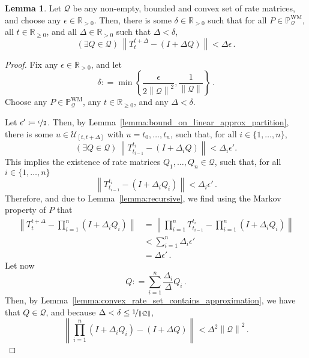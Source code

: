 \documentclass[10pt]{paper}
\theoremstyle{definition}
\newtheorem{lemma}[theorem]{Lemma}
\newcommand{\reals}{\mathbb{R}}
\newcommand{\realspos}{\reals_{>0}}
\newcommand{\realsnonneg}{\reals_{\geq 0}}
\newcommand{\processes}{\mathbb{P}}
\newcommand{\wmprocesses}{\processes^{\mathrm{WM}}}
\newcommand{\rateset}{\mathcal{Q}}
\newcommand{\norm}[1]{\left\lVert #1 \right\rVert}
\newcommand{\coloneqq}{:\!=}
\begin{document}
\begin{lemma}\label{lemma:uniform_delta_for_convex_markov_set}
Let $\rateset$ be any non-empty, bounded and convex set of rate matrices, and choose any $\epsilon\in\realspos$. Then, there is some $\delta\in\realspos$ such that for all $P\in\wmprocesses_\rateset$, all $t\in\realsnonneg$, and all $\Delta\in\realspos$ such that $\Delta<\delta$,
\begin{equation*}
(\exists Q\in\rateset)\,\norm{T_{t}^{t+\Delta} - (I+\Delta Q)} < \Delta\epsilon\,.
\end{equation*}
\end{lemma}
\begin{proof}
Fix any $\epsilon\in\realspos$, and let
\begin{equation*}
\delta \coloneqq \min\left\{\frac{\epsilon}{2\norm{\rateset}^2},\frac{1}{\norm{\rateset}}\right\}\,.
\end{equation*}
Choose any $P\in\wmprocesses_\rateset$, any $t\in\realsnonneg$, and any $\Delta<\delta$.

Let $\epsilon'\coloneqq \nicefrac{\epsilon}{2}$. Then, by Lemma~\ref{lemma:bound_on_linear_approx_partition}, there is some $u\in\mathcal{U}_{[t,t+\Delta]}$ with $u=t_0,\ldots,t_n$, such that, for all $i\in\{1,\ldots,n\}$,
\begin{equation*}
(\exists Q\in\rateset)\,\norm{T_{t_{i-1}}^{t_i} - (I+\Delta_iQ)} < \Delta_i\epsilon'.
\end{equation*}
This implies the existence of rate matrices $Q_1,\ldots,Q_n\in\rateset$, such that, for all $i\in\{1,\ldots,n\}$
\begin{equation*}
\norm{T_{t_{i-1}}^{t_i} - (I+\Delta_iQ_i)} < \Delta_i\epsilon'\,.
\end{equation*}
Therefore, and due to Lemma~\ref{lemma:recursive}, we find using the Markov property of $P$ that
\begin{align*}
\norm{T_t^{t+\Delta} - \prod_{i=1}^n(I+\Delta_iQ_i)} &= \norm{\prod_{i=1}^nT_{t_{i-1}}^{t_i} - \prod_{i=1}^n(I+\Delta_iQ_i)} \\
 &< \sum_{i=1}^n\Delta_i\epsilon' \\
 &= \Delta\epsilon'\,.
\end{align*}
Let now
\begin{equation*}
Q\coloneqq \sum_{i=1}^n \frac{\Delta_i}{\Delta} Q_i\,.
\end{equation*}
Then, by Lemma~\ref{lemma:convex_rate_set_contains_approximation}, we have that $Q\in\rateset$, and because $\Delta<\delta\leq\nicefrac{1}{\norm{\rateset}}$,
\begin{equation*}
\norm{\prod_{i=1}^n(I+\Delta_iQ_i) - (I+\Delta Q)} < \Delta^2\norm{\rateset}^2\,.
\end{equation*}


\end{proof}
\end{document}
